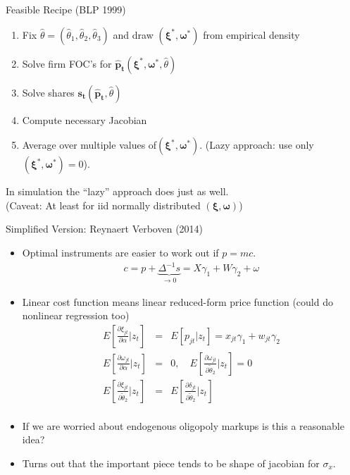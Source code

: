 \documentclass[xcolor=pdftex,dvipsnames,table,mathserif,aspectratio=169]{beamer}
\begin{document}
\begin{frame}{Feasible Recipe (BLP 1999)}
\begin{enumerate}
\item Fix $\widehat{\theta}=(\widehat{\theta}_1,\widehat{\theta}_2,\widehat{\theta}_3)$ and draw $(\boldsymbol{\xi}^{*},\boldsymbol{\omega}^{*})$ from empirical density
\item Solve firm FOC's for $\mathbf{\hat{p}_{t}}(\boldsymbol{\xi}^{*},\boldsymbol{\omega}^{*},\widehat{\theta})$
\item Solve shares $\mathbf{s_{t}}(\mathbf{\hat{p}_{t}},\widehat{\theta})$
\item Compute necessary Jacobian
\item Average over multiple values of$(\boldsymbol{\xi}^{*},\boldsymbol{\omega}^{*})$. (Lazy approach: use only $(\boldsymbol{\xi}^{*},\boldsymbol{\omega}^{*})=0$).
\end{enumerate}
In simulation the ``lazy'' approach does just as well.\\
 (Caveat: At least for iid normally distributed $(\boldsymbol{\xi},\boldsymbol{\omega})$)
\end{frame}



\begin{frame}{Simplified Version: Reynaert Verboven (2014)}
\begin{itemize}
\footnotesize
\item Optimal instruments are easier to work out if $p = mc$.
\begin{eqnarray*}
c = p  + \underbrace{\Delta^{-1} s}_{\rightarrow 0}  = X \gamma_1 + W \gamma_2 + \omega
\end{eqnarray*}
\item Linear cost function means linear reduced-form price function (could do nonlinear regression too)
\begin{eqnarray*}
E\left[ \frac{\partial \xi_{jt} }{\partial \alpha} | z_t \right] &=& E[p_{jt} | z_t] = x_{jt} \gamma_1 + w_{jt} \gamma_2\\
E\left[ \frac{\partial \omega_{jt} }{\partial \alpha} | z_t \right] &=& 0 , \quad E\left[ \frac{\partial \omega_{jt} }{\partial \widetilde{\theta}_2} | z_t \right] = 0\\
E\left[ \frac{\partial \xi_{jt} }{\partial \widetilde{\theta}_2} | z_t \right] &=&E\left[ \frac{\partial \delta_{jt} }{\partial \widetilde{\theta}_2} | z_t \right]\\
\end{eqnarray*}
\item If we are worried about endogenous oligopoly markups is this a reasonable idea?
\item Turns out that the important piece tends to be \alert{shape} of jacobian for $\sigma_x$.
\end{itemize}
\end{frame}
\end{document}
